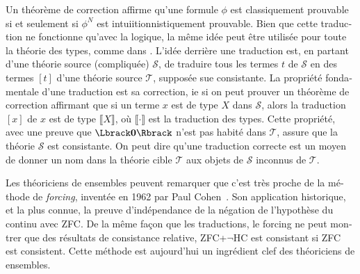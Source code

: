 \begin{otherlanguage}{french}
Un théorème de correction affirme qu'une formule $\phi$ est
classiquement prouvable si et seulement si $\phi^N$ est
intuiitionnistiquement prouvable. Bien que cette traduction ne
fonctionne qu'avec la logique, la même idée peut être utilisée pour
toute la théorie des types, comme dans
\cite{jaber2012extending,forcing2016}.
L'idée derrière une traduction est, en partant d'une théorie source
(compliquée) $\mathcal S$, de traduire tous les termes $t$ de
$\mathcal S$ en des termes $[t]$ d'une théorie source $\mathcal T$,
supposée sue consistante. La propriété fondamentale d'une traduction
est sa correction, ie{} si on peut prouver un théorème de correction
affirmant que si un terme $x$ est de type $X$ dans $\mathcal S$, alors
la traduction $[x]$ de $x$ est de type $\Lbrack X \Rbrack$, où
$\Lbrack\cdot\Rbrack$ est la traduction des types. Cette propriété,
avec une preuve que $\Lbrack\zero\Rbrack$ n'est pas habité dans
$\mathcal T$, assure que la théorie $\mathcal S$ est consistante. On
peut dire qu'une traduction correcte est un moyen de donner un nom
dans la théorie cible $\mathcal T$ aux objets de $\mathcal S$ inconnus
de $\mathcal T$.

Les théoriciens de ensembles peuvent remarquer que c'est très proche
de la méthode de {\em forcing}, inventée en 1962 par Paul
Cohen~\cite{cohen1966}. Son application historique, et la plus connue,
la preuve d'indépendance de la négation de l'hypothèse du continu avec
ZFC. De la même façon que les traductions, le forcing ne peut montrer
que des résultats de consistance relative, \eg{} ZFC+$\lnot$HC est
consistant si ZFC est consistent. Cette méthode est aujourd'hui un
ingrédient clef des théoriciens de ensembles.


\end{otherlanguage}
